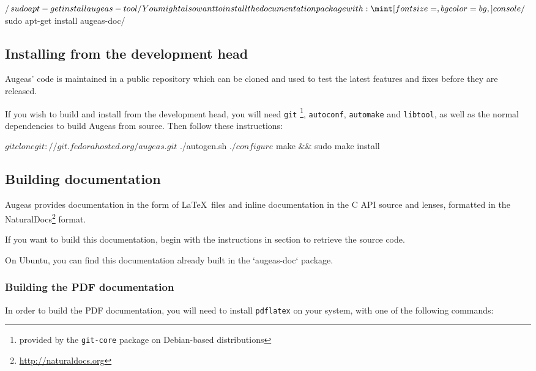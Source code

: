 \consolecode/$ sudo apt-get install augeas-tool/

You might also want to install the documentation package with:

\consolecode/$ sudo apt-get install augeas-doc/

\subsection{Installing from the development head}


Augeas' code is maintained in a public repository which can be cloned and used to test the latest features and fixes before they are released.

If you wish to build and install from the development head, you will need \verb!git! \footnote{provided by the \verb!git-core! package on Debian-based distributions}, \verb!autoconf!, \verb!automake! and \verb!libtool!, as well as the normal dependencies to build Augeas from source. Then follow these instructions:

\begin{console}[]
$ git clone git://git.fedorahosted.org/augeas.git
$ ./autogen.sh
$ ./configure
$ make && sudo make install
\end{console}


\subsection{Building documentation}

Augeas provides documentation in the form of \LaTeX~files and inline documentation in the C API source and lenses, formatted in the NaturalDocs\footnote{\url{http://naturaldocs.org}} format.

If you want to build this documentation, begin with the instructions in section  to retrieve the source code.

On Ubuntu, you can find this documentation already built in the `augeas-doc` package.


\subsubsection{Building the PDF documentation}

In order to build the PDF documentation, you will need to install \verb!pdflatex! on your system, with one of the following commands:

